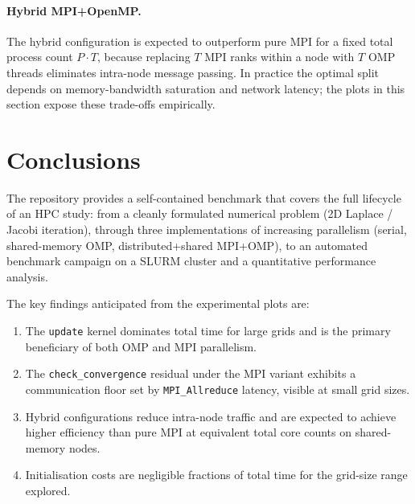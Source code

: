 \documentclass[11pt,a4paper]{article}
\begin{document}
\paragraph{Hybrid MPI+OpenMP.}
The hybrid configuration is expected to outperform pure MPI for a fixed total
process count $P\cdot T$, because replacing $T$ MPI ranks within a node with
$T$ OMP threads eliminates intra-node message passing.
In practice the optimal split depends on memory-bandwidth saturation and
network latency; the plots in this section expose these trade-offs empirically.

\section{Conclusions}

The repository provides a self-contained benchmark that covers the full
lifecycle of an HPC study: from a cleanly formulated numerical problem
(2D Laplace / Jacobi iteration), through three implementations of increasing
parallelism (serial, shared-memory OMP, distributed+shared MPI+OMP), to an
automated benchmark campaign on a SLURM cluster and a quantitative
performance analysis.

The key findings anticipated from the experimental plots are:
\begin{enumerate}
  \item The \texttt{update} kernel dominates total time for large grids and
        is the primary beneficiary of both OMP and MPI parallelism.
  \item The \texttt{check\_convergence} residual under the MPI variant
        exhibits a communication floor set by \texttt{MPI\_Allreduce} latency,
        visible at small grid sizes.
  \item Hybrid configurations reduce intra-node traffic and are expected to
        achieve higher efficiency than pure MPI at equivalent total core counts
        on shared-memory nodes.
  \item Initialisation costs are negligible fractions of total time for the
        grid-size range explored.
\end{enumerate}
\end{document}
